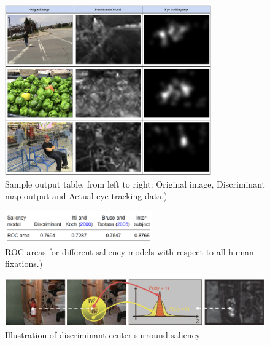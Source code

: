 \documentclass[conference]{IEEEtran}
\begin{document}
\begin{figure}[h]
    \centering
    \includegraphics[width=3.5in]{outputs.png}
    \caption{Sample output table, from left to right: Original image, Discriminant map output and Actual eye-tracking data.) }
    \label{fig:outputs}
\end{figure}

\begin{figure}[h]
    \centering
    \includegraphics[width=2.5in]{score.png}
    \caption{ROC areas for different saliency models with respect to all human fixations.) }
    \label{fig:ROCscore}
\end{figure}

\begin{figure}[h]
    \centering
    \includegraphics[width=7in]{research.png}
    \caption{ Illustration of discriminant center-surround saliency}
    \label{fig:centersurround}
\end{figure}



\end{document}
